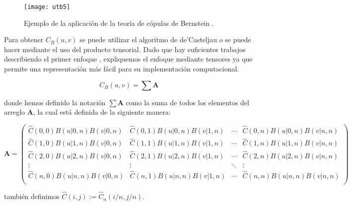\begin{figure}[H]
	\centering
\texttt{[image: utb5]}
	\caption{Ejemplo de la aplicaci\'on de la teor\'ia de c\'opulas de Bernstein \citep{erdely_joint_2012}.}
	\label{f:phiK}
\end{figure}


Para obtener $C_B(u,v)$ se puede utilizar el algoritmo de de'Casteljau o se puede hacer mediante el uso del producto tensorial. Dado que hay suficientes trabajos describiendo el primer enfoque \citep{goldman_pyramid_2002,mann_blossoming_2006}, expliquemos el enfoque mediante tensores \citep{renteln_manifolds_2014} ya que permite una representaci\'on m\'as f\'acil para su implementaci\'on computacional.

\begin{equation}
	C_B(u,v) = \sum \mathbf{A}
\end{equation}	

\noindent
donde hemos definido la notaci\'on $\sum \mathbf{A}$ como la suma de todos los elementos del arreglo $\mathbf{A}$, la cual est\'a definida de la siguiente manera:

\begin{equation}
	\mathbf{A} = 
	\begin{pmatrix}
		\hat{C}(0,0)B(u|0,n)B(v|0,n)  & \hat{C}(0,1)B(u|0,n)B(v|1,n) & \cdots & \hat{C}(0,n)B(u|0,n)B(v|n,n)\\
		\hat{C}(1,0)B(u|1,n)B(v|0,n)  & \hat{C}(1,1)B(u|1,n)B(v|1,n) & \cdots & \hat{C}(1,n)B(u|1,n)B(v|n,n)\\
		\hat{C}(2,0)B(u|2,n)B(v|0,n)  & \hat{C}(2,1)B(u|2,n)B(v|1,n) & \cdots & \hat{C}(2,n)B(u|2,n)B(v|n,n)\\
		\vdots & \vdots & \ddots & \vdots \\
		\hat{C}(n,0)B(u|n,n)B(v|0,n)  & \hat{C}(n,1)B(u|n,n)B(v|1,n) & \cdots & \hat{C}(n,n)B(u|n,n)B(v|n,n)\\
	\end{pmatrix}
\end{equation}

\noindent
tambi\'en definimos $\hat{C}(i,j):= \hat{C}_n (i/n,j/n)$.

